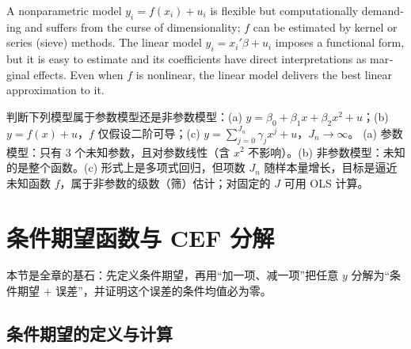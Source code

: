 \begin{center}
\label{fig:U02-np}
\end{center}

\begin{english}
A nonparametric model $y_i=f(x_i)+u_i$ is flexible but computationally demanding and suffers from the curse of dimensionality; $f$ can be estimated by kernel or series (sieve) methods. The linear model $y_i=x_i'\beta+u_i$ imposes a functional form, but it is easy to estimate and its coefficients have direct interpretations as marginal effects. Even when $f$ is nonlinear, the linear model delivers the best linear approximation to it.
\end{english}

\begin{prac}[模型分类]
判断下列模型属于参数模型还是非参数模型：(a) $y=\beta_0+\beta_1x+\beta_2x^2+u$；(b) $y=f(x)+u$，$f$ 仅假设二阶可导；(c) $y=\sum_{j=0}^{J_n}\gamma_jx^j+u$，$J_n\to\infty$。
\answer
(a) 参数模型：只有 3 个未知参数，且对参数线性（含 $x^2$ 不影响）。(b) 非参数模型：未知的是整个函数。(c) 形式上是多项式回归，但项数 $J_n$ 随样本量增长，目标是逼近未知函数 $f$，属于非参数的级数（筛）估计；对固定的 $J$ 可用 OLS 计算。
\end{prac}

\section{条件期望函数与 CEF 分解}\label{sec:U02-cef}

本节是全章的基石：先定义条件期望，再用“加一项、减一项”把任意 $y$ 分解为“条件期望 $+$ 误差”，并证明这个误差的条件均值必为零。

\subsection{条件期望的定义与计算}

